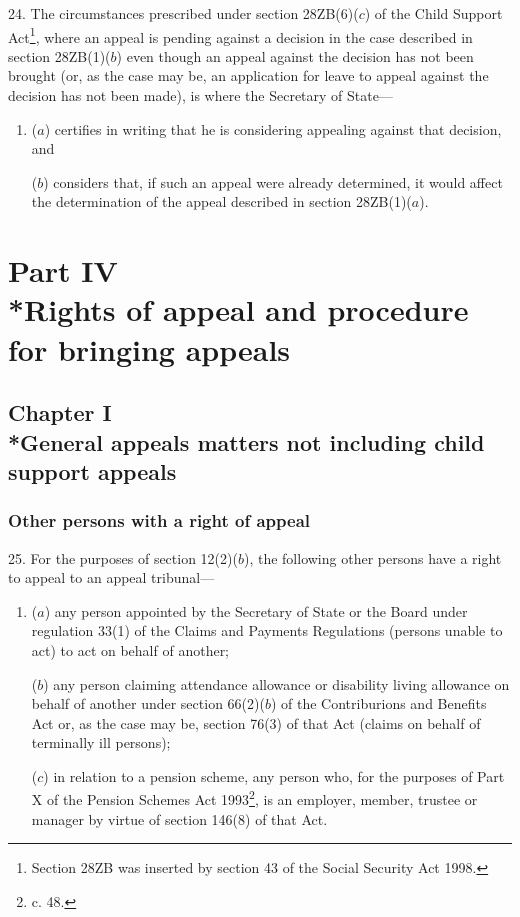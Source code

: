\documentclass[12pt,a4paper]{article}
\begin{document}
24.  The circumstances prescribed under section 28ZB(6)($c$) of the Child Support Act\footnote{\frenchspacing Section 28ZB was inserted by section 43 of the Social Security Act 1998.}, where an appeal is pending against a decision in the case described in section 28ZB(1)($b$) even though an appeal against the decision has not been brought (or, as the case may be, an application for leave to appeal against the decision has not been made), is where the Secretary of State—
\begin{enumerate}\item[]
($a$) certifies in writing that he is considering appealing against that decision, and

($b$) considers that, if such an appeal were already determined, it would affect the determination of the appeal described in section 28ZB(1)($a$).
\end{enumerate}

\section[Part IV --- Rights of appeal and procedure for bringing appeals]{Part IV\\*Rights of appeal and procedure for bringing appeals}

\subsection[Chapter I --- General appeals matters not including child support appeals]{Chapter I\\*General appeals matters not including child support appeals}

\renewcommand\parthead{--- Part IV Chapter I}

\subsubsection[25. Other persons with a right of appeal]{Other persons with a right of appeal}

25.  For the purposes of section 12(2)($b$), the following other persons have a right to appeal to an appeal tribunal—
\begin{enumerate}\item[]
($a$) any person appointed by the Secretary of State 
or the Board  %
under regulation 33(1) of the Claims and Payments Regulations (persons unable to act) to act on behalf of another;

($b$) any person claiming attendance allowance or disability living allowance on behalf of another under section 66(2)($b$) of the Contriburions and Benefits Act or, as the case may be, section 76(3) of that Act (claims on behalf of terminally ill persons);

($c$) in relation to a pension scheme, any person who, for the purposes of Part X of the Pension Schemes Act 1993\footnote{ c. 48.}, is an employer, member, trustee or manager by virtue of section 146(8) of that Act.
\end{enumerate}
\end{document}
